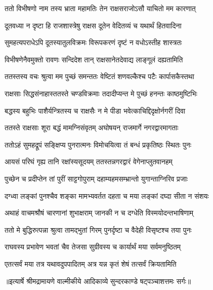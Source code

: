 \twolineshloka
{ततो विभीषणो नाम तस्य भ्राता महामतिः}
{तेन राक्षसराजोऽसौ याचितो मम कारणात्} %

\twolineshloka
{दूतवध्या न दृष्टा हि राजशास्त्रेषु राक्षस}
{दूतेन वेदितव्यं च यथार्थं हितवादिना} %

\twolineshloka
{सुमहत्यपराधेऽपि दूतस्यातुलविक्रमः}
{विरूपकरणं दृष्टं न वधोऽस्तीह शास्त्रतः} %

\twolineshloka
{विभीषणेनैवमुक्तो रावणः सन्दिदेश तान्}
{राक्षसानेतदेवाद्य लाङ्गूलं दह्यतामिति} %

\twolineshloka
{ततस्तस्य वचः श्रुत्वा मम पुच्छं समन्ततः}
{वेष्टितं शणवल्कैश्च पटैः कार्पासकैस्तथा} %

\twolineshloka
{राक्षसाः सिद्धसंनाहास्ततस्ते चण्डविक्रमाः}
{तदादीप्यन्त मे पुच्छं हनन्तः काष्ठमुष्टिभिः} %

\twolineshloka
{बद्धस्य बहुभिः पाशैर्यन्त्रितस्य च राक्षसैः}
{न मे पीडा भवेत्काचिद्दिदृक्षोर्नगरीं दिवा} %

\twolineshloka
{ततस्ते राक्षसाः शूरा बद्धं मामग्निसंवृतम्}
{अघोषयन् राजमार्गे नगरद्वारमागताः} %

\twolineshloka
{ततोऽहं सुमहद्रूपं सङ्क्षिप्य पुनरात्मनः}
{विमोचयित्वा तं बन्धं प्रकृतिष्ठः स्थितः पुनः} %

\twolineshloka
{आयसं परिघं गृह्य तानि रक्षांस्यसूदयम्}
{ततस्तन्नगरद्वारं वेगेनाप्लुतवानहम्} %

\twolineshloka
{पुच्छेन च प्रदीप्तेन तां पुरीं साट्टगोपुराम्}
{दहाम्यहमसम्भ्रान्तो युगान्ताग्निरिव प्रजाः} %

\twolineshloka
{दग्ध्वा लङ्कां पुनश्चैव शङ्का मामभ्यवर्तत}
{दहता च मया लङ्कां दघ्दा सीता न संशयः} %

\twolineshloka
{अथाहं वाचमश्रौषं चारणानां शुभाक्षराम्}
{जानकी न च दग्धेति विस्मयोदन्तभाषिणाम्} %

\twolineshloka
{ततो मे बुद्धिरुत्पन्ना श्रुत्वा तामद्भुतां गिरम्}
{पुनर्दृष्टा च वैदेही विसृष्टश्च तया पुनः} %

\twolineshloka
{राघवस्य प्रभावेण भवतां चैव तेजसा}
{सुग्रीवस्य च कार्यार्थं मया सर्वमनुष्ठितम्} %

\twolineshloka
{एतत्सर्वं मया तत्र यथावदुपपादितम्}
{अत्र यन्न कृतं शेषं तत्सर्वं क्रियतामिति} %


{॥इत्यार्षे श्रीमद्रामायणे वाल्मीकीये आदिकाव्ये सुन्दरकाण्डे षट्पञ्चाशत्तमः सर्गः॥}


